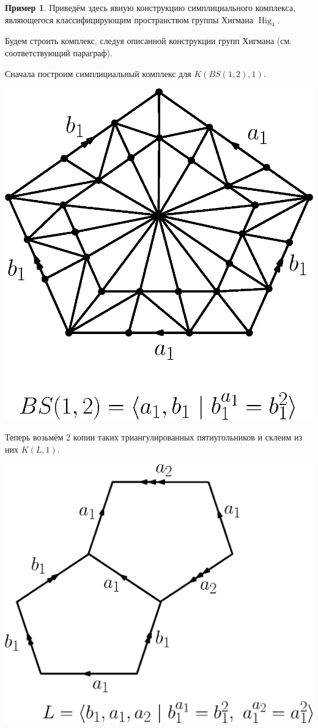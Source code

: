 \documentclass[14pt, dvipsnames]{extarticle}
\theoremstyle{definition}
\newtheorem{example}{Пример}
\theoremstyle{remark}
\DeclareMathOperator{\Hig}{\mathrm{Hig}}
\begin{document}
\begin{example}

Приведём здесь явную конструкцию симплициального комплекса, являющегося классифицирующим пространством группы Хигмана $\Hig_4$.

Будем строить комплекс, следуя описанной конструкции групп Хигмана (см. соответствующий параграф).

Сначала построим симплициальный комплекс для $K(BS(1, 2), 1)$.


\begin{center}
\includegraphics[scale=0.6]{BS}
\end{center}


Теперь возьмём 2 копии таких триангулированных пятиугольников и склеим из них $K(L, 1)$.


\begin{center}
\includegraphics[scale=0.6]{L}
\end{center}



\end{example}
\end{document}
